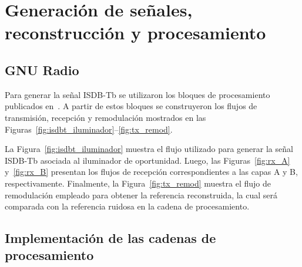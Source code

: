 \chapter{Generación de señales, reconstrucción y procesamiento}
\section{GNU Radio}
Para generar la señal ISDB-Tb se utilizaron los bloques de procesamiento publicados en~\cite{grisdbt_repo}. A partir de estos bloques se construyeron los flujos de transmisión, recepción y remodulación mostrados en las Figuras~\ref{fig:isdbt_iluminador}--\ref{fig:tx_remod}.




La Figura~\ref{fig:isdbt_iluminador} muestra el flujo utilizado para generar la señal ISDB-Tb asociada al iluminador de oportunidad. Luego, las Figuras~\ref{fig:rx_A} y~\ref{fig:rx_B} presentan los flujos de recepción correspondientes a las capas A y B, respectivamente. Finalmente, la Figura~\ref{fig:tx_remod} muestra el flujo de remodulación empleado para obtener la referencia reconstruida, la cual será comparada con la referencia ruidosa en la cadena de procesamiento.

\newpage
\section{Implementación de las cadenas de procesamiento}
